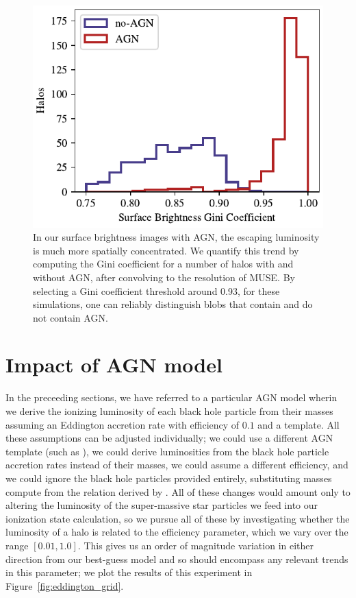 \begin{figure}
    \centering
    \includegraphics[width=\textwidth,keepaspectratio]{figures/skew_distribution.pdf}
    \caption{
        In our surface brightness images with AGN, the escaping luminosity is much more spatially concentrated.
        We quantify this trend by computing the Gini coefficient for a number of halos with and without AGN, after convolving to the resolution of MUSE.
        By selecting a Gini coefficient threshold around 0.93, for these simulations, one can reliably distinguish blobs that contain and do not contain AGN.
    }
    \label{fig:skewness}
\end{figure}


\section{Impact of AGN model}

In the preceeding sections, we have referred to a particular AGN model wherin we derive the ionizing luminosity of each black hole particle from their masses assuming an Eddington accretion rate with efficiency of $0.1$ and a \citet*{Hopkins2007} template.
All these assumptions can be adjusted individually; we could use a different AGN template (such as \citet{Nenkova2008}), we could derive luminosities from the black hole particle accretion rates instead of their masses, we could assume a different efficiency, and we could ignore the black hole particles provided entirely, substituting masses compute from the relation derived by \citet{Magorrian1998}.
All of these changes would amount only to altering the luminosity of the super-massive star particles we feed into our ionization state calculation, so we pursue all of these by investigating whether the luminosity of a halo is related to the efficiency parameter, which we vary over the range $[0.01, 1.0]$.
This gives us an order of magnitude variation in either direction from our best-guess model and so should encompass any relevant trends in this parameter; we plot the results of this experiment in Figure~\ref{fig:eddington_grid}.

